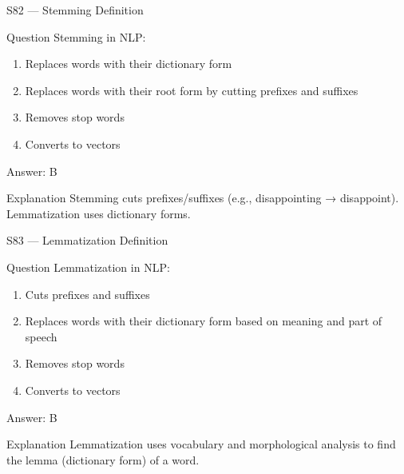 \documentclass[aspectratio=169,8pt]{beamer}
\begin{document}
	\begin{frame}{S82 --- Stemming Definition}
		\begin{block}{Question}
			Stemming in NLP:
			\begin{enumerate}
				\item Replaces words with their dictionary form
				\item Replaces words with their root form by cutting prefixes and suffixes
				\item Removes stop words
				\item Converts to vectors
			\end{enumerate}
		\end{block}
		\begin{exampleblock}{Answer: B}\end{exampleblock}
		\begin{block}{Explanation}
			Stemming cuts prefixes/suffixes (e.g., disappointing → disappoint). Lemmatization uses dictionary forms.
		\end{block}
	\end{frame}
	
	\begin{frame}{S83 --- Lemmatization Definition}
		\begin{block}{Question}
			Lemmatization in NLP:
			\begin{enumerate}
				\item Cuts prefixes and suffixes
				\item Replaces words with their dictionary form based on meaning and part of speech
				\item Removes stop words
				\item Converts to vectors
			\end{enumerate}
		\end{block}
		\begin{exampleblock}{Answer: B}\end{exampleblock}
		\begin{block}{Explanation}
			Lemmatization uses vocabulary and morphological analysis to find the lemma (dictionary form) of a word.
		\end{block}
	\end{frame}
	
\end{document}

